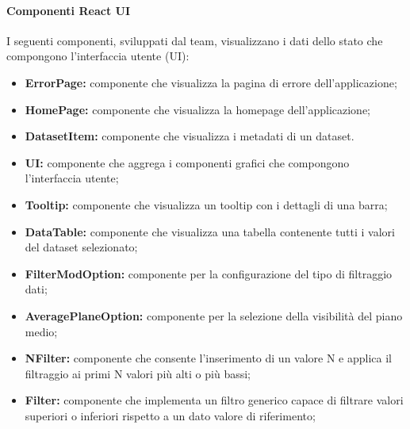 \paragraph{Componenti React UI}
    I seguenti componenti, sviluppati dal team, visualizzano i dati dello stato che compongono l'interfaccia utente (UI):
    \begin{itemize}
        \item \textbf{ErrorPage:} componente che visualizza la pagina di errore dell'applicazione;
        \item \textbf{HomePage:} componente che visualizza la homepage dell'applicazione;
        \item \textbf{DatasetItem:} componente che visualizza i metadati di un dataset.
        \item \textbf{UI:} componente che aggrega i componenti grafici che compongono l'interfaccia utente;
                \item \textbf{Tooltip:} componente che visualizza un tooltip con i dettagli di una barra;
        \item \textbf{DataTable:} componente che visualizza una tabella contenente tutti i valori del dataset selezionato;
        \item \textbf{FilterModOption:} componente per la configurazione del tipo di filtraggio dati;
        \item \textbf{AveragePlaneOption:} componente per la selezione della visibilità del piano medio;
        \item \textbf{NFilter:} componente che consente l'inserimento di un valore N e applica il filtraggio ai primi N valori più alti o più bassi;
        \item \textbf{Filter:} componente che implementa un filtro generico capace di filtrare valori superiori o inferiori rispetto a un dato valore di riferimento;
    \end{itemize}
